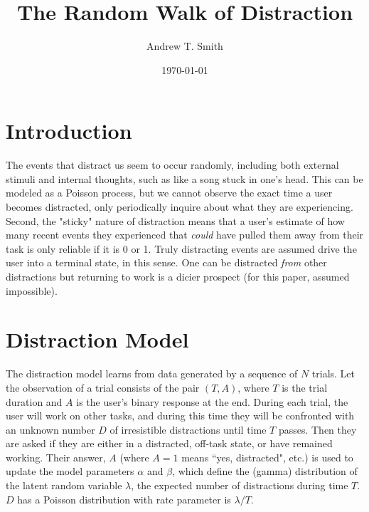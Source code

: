 \documentclass{article}
\begin{document}
\title{The Random Walk of Distraction}
\author{Andrew T. Smith}
\date{\today}
\maketitle

\section{Introduction}
The events that distract us seem to occur randomly, including both external stimuli and internal thoughts, such as like a song stuck in one's head.   This can be modeled as a Poisson process, but we cannot observe the exact time a user becomes distracted, only periodically inquire about what they are experiencing.  Second, the "sticky" nature of distraction means that a user's estimate of how many recent events they experienced that \emph{could} have pulled them away from their task is only reliable if it is 0 or 1.  Truly distracting events are assumed drive the user into a terminal state, in this sense. One can be distracted \emph{from} other distractions but returning to work is a dicier prospect (for this paper, assumed impossible).

\section{Distraction Model}
The distraction model learns from data generated by a sequence of $N$ trials.  Let the observation of a trial consists of the pair $(T, A)$, where $T$ is the trial duration and $A$ is the user's binary response at the end.  During each trial, the user will work on other tasks, and during this time they will be confronted with an unknown number $D$ of irresistible distractions until time $T$ passes. Then they are asked if they are either in a distracted, off-task state, or have remained working.  Their answer, $A$ (where $A=1$ means ``yes, distracted", etc.) is used to update the model parameters $\alpha$ and $\beta$, which define the (gamma) distribution of the latent random variable  $\lambda$, the expected number of distractions during time $T$.  $D$ has a Poisson distribution with rate parameter is $\lambda/T$.
\renewcommand{\arraystretch}{1.2}
\newcommand{\poisson}{{\rm Pr}}
\newcommand{\exponential}{{\rm Exp}}

\begin{minipage}{\linewidth}
	\centering
\end{minipage}\\\\
\end{document}
